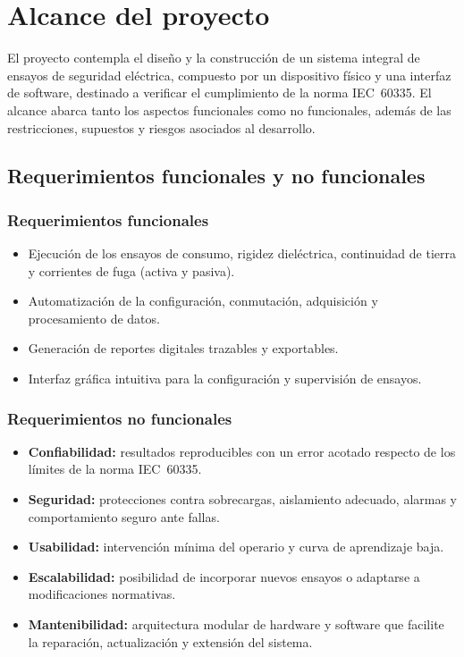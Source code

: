 \section{Alcance del proyecto}
\label{sec:alcance}

El proyecto contempla el diseño y la construcción de un sistema integral de
ensayos de seguridad eléctrica, compuesto por un dispositivo físico y una interfaz
de software, destinado a verificar el cumplimiento de la norma IEC~60335. El
alcance abarca tanto los aspectos funcionales como no funcionales, además de las
restricciones, supuestos y riesgos asociados al desarrollo.

\subsection{Requerimientos funcionales y no funcionales}

\subsubsection{Requerimientos funcionales}
\begin{itemize}
    \item Ejecución de los ensayos de consumo, rigidez dieléctrica, continuidad de
          tierra y corrientes de fuga (activa y pasiva).
    \item Automatización de la configuración, conmutación, adquisición y
          procesamiento de datos.
    \item Generación de reportes digitales trazables y exportables.
    \item Interfaz gráfica intuitiva para la configuración y supervisión de
          ensayos.
\end{itemize}

\subsubsection{Requerimientos no funcionales}
\begin{itemize}
    \item \textbf{Confiabilidad:} resultados reproducibles con un error acotado
          respecto de los límites de la norma IEC~60335.
    \item \textbf{Seguridad:} protecciones contra sobrecargas, aislamiento
          adecuado, alarmas y comportamiento seguro ante fallas.
    \item \textbf{Usabilidad:} intervención mínima del operario y curva de
          aprendizaje baja.
    \item \textbf{Escalabilidad:} posibilidad de incorporar nuevos ensayos o
          adaptarse a modificaciones normativas.
    \item \textbf{Mantenibilidad:} arquitectura modular de hardware y software que
          facilite la reparación, actualización y extensión del sistema.
\end{itemize}

